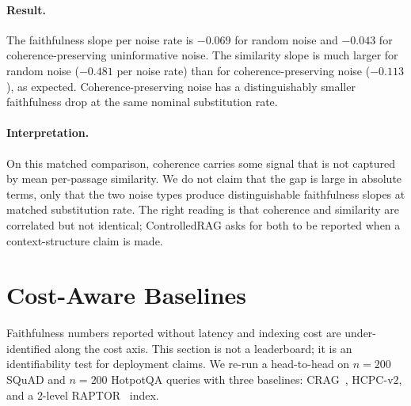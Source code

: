 \paragraph{Result.} The faithfulness slope per noise rate is
$-0.069$ for random noise and $-0.043$ for coherence-preserving
uninformative noise. The similarity slope is much larger for random
noise ($-0.481$ per noise rate) than for coherence-preserving noise
($-0.113$), as expected. Coherence-preserving noise has a
distinguishably smaller faithfulness drop at the same nominal
substitution rate.

\paragraph{Interpretation.} On this matched comparison, coherence
carries some signal that is not captured by mean per-passage
similarity. We do not claim that the gap is large in absolute terms,
only that the two noise types produce distinguishable faithfulness
slopes at matched substitution rate. The right reading is that
coherence and similarity are correlated but not identical; ControlledRAG
asks for both to be reported when a context-structure claim is made.

\section{Cost-Aware Baselines}
\label{sec:cost}

Faithfulness numbers reported without latency and indexing cost are
under-identified along the cost axis. This section is not a leaderboard;
it is an identifiability test for deployment claims. We re-run a
head-to-head on $n=200$ SQuAD and $n=200$ HotpotQA queries with three
baselines: CRAG~\citep{yan2024crag}, HCPC-v$2$, and a $2$-level
RAPTOR~\citep{raptor2024} index.

